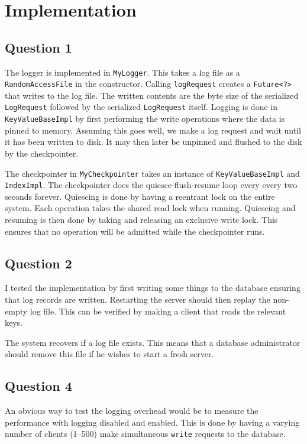 \documentclass[a4paper]{article}
\begin{document}
\section{Implementation}

\subsection{Question 1}

The logger is implemented in \texttt{MyLogger}.  This takes a log file as a
\texttt{RandomAccessFile} in the constructor. Calling \texttt{logRequest}
creates a \texttt{Future<?>} that writes to the log file. The written contents
are the byte size of the serialized \texttt{LogRequest} followed by the
serialized \texttt{LogRequest} itself. Logging is done in
\texttt{KeyValueBaseImpl} by first performing the write operations where the
data is pinned to memory. Assuming this goes well, we make a log request and
wait until it has been written to disk. It may then later be unpinned and
flushed to the disk by the checkpointer.

The checkpointer in \texttt{MyCheckpointer} takes an instance of
\texttt{KeyValueBaseImpl} and \texttt{IndexImpl}. The checkpointer does the
quiesce-flush-resume loop every every two seconds forever. Quiescing is done by
having a reentrant lock on the entire system. Each operation takes the shared
read lock when running. Quiescing and resuming is then done by taking and
releasing an exclusive write lock. This ensures that no operation will be
admitted while the checkpointer runs.

\subsection{Question 2}

I tested the implementation by first writing some things to the database
ensuring that log records are written. Restarting the server should then replay
the non-empty log file. This can be verified by making a client that reads the
relevant keys.

The system recovers if a log file exists. This means that a database
administrator should remove this file if he wishes to start a fresh server.

\subsection{Question 4}

An obvious way to test the logging overhead would be to measure the performance
with logging disabled and enabled. This is done by having a varying number of
clients (1--500) make simultaneous \texttt{write} requests to the database.
\end{document}
